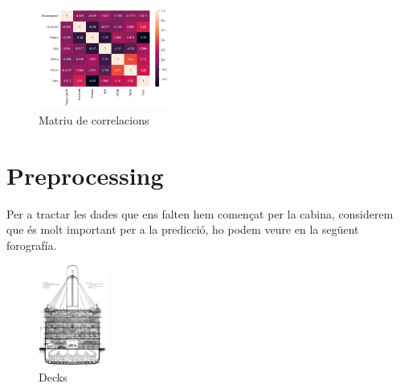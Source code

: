 \documentclass[9pt,a4paper,twoside]{tau-class/tau}
\begin{document}
\begin{figure}[H]
    \centering
    \includegraphics[width=0.4\textwidth]{figures/matriu_corr.png}
    \caption{Matriu de correlacions}
    \label{fig:exemple}
\end{figure}

\section{Preprocessing}

Per a tractar les dades que ens falten hem començat per la cabina, considerem que és molt important per a la predicció, ho podem veure en la següent forografía.

\begin{figure}[H]
    \centering
    \includegraphics[width=0.2\textwidth]{figures/decks.png}
    \caption{Decks}
    \label{fig:exemple}
\end{figure}
\end{document}
